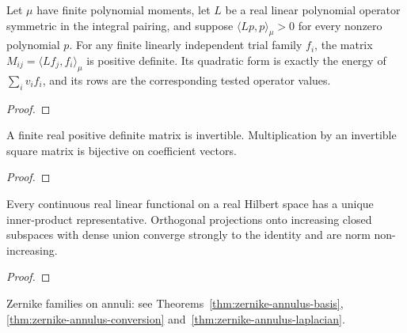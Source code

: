 \begin{supporting}
\begin{theorem}
\label{thm:finite-polynomial-galerkin}
\leanok
Let $\mu$ have finite polynomial moments, let $L$ be a real linear polynomial
operator symmetric in the integral pairing, and suppose
$\langle Lp,p\rangle_\mu>0$ for every nonzero polynomial $p$.
For any finite linearly independent trial family $f_i$, the matrix
$M_{ij}=\langle Lf_j,f_i\rangle_\mu$ is positive definite. Its quadratic form is
exactly the energy of $\sum_i v_i f_i$, and its rows are the corresponding tested
operator values.
\end{theorem}
\begin{proof}
\leanok
\end{proof}

\begin{theorem}
\label{thm:mathlib-positive-invertible}
\mathlibok
A finite real positive definite matrix is invertible. Multiplication by an
invertible square matrix is bijective on coefficient vectors.
\end{theorem}
\begin{proof}
\mathlibok
\end{proof}

\begin{theorem}
\label{thm:mathlib-hilbert-projection-limit}
\mathlibok
Every continuous real linear functional on a real Hilbert space has a unique
inner-product representative. Orthogonal projections onto increasing closed
subspaces with dense union converge strongly to the identity and are norm
non-increasing.
\end{theorem}
\begin{proof}
\mathlibok
\end{proof}

\end{supporting}

Zernike families on annuli: see Theorems~\ref{thm:zernike-annulus-basis}, \ref{thm:zernike-annulus-conversion} and~\ref{thm:zernike-annulus-laplacian}.

